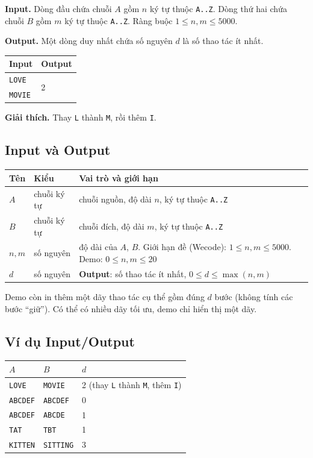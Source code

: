 \documentclass[12pt,a4paper]{article}
\newcommand{\code}[1]{\texttt{#1}}
\begin{document}
\textbf{Input.} Dòng đầu chứa chuỗi $A$ gồm $n$ ký tự thuộc \code{A..Z}. Dòng thứ hai chứa chuỗi $B$ gồm $m$ ký tự thuộc \code{A..Z}. Ràng buộc $1\le n,m\le 5000$.

\textbf{Output.} Một dòng duy nhất chứa số nguyên $d$ là số thao tác ít nhất.

\begin{center}
\begin{tabular}{@{}ll@{}}
\toprule
Input & Output\\
\midrule
\code{LOVE} & \multirow{2}{*}{2}\\
\code{MOVIE} &\\
\bottomrule
\end{tabular}
\end{center}
\textbf{Giải thích.} Thay \code{L} thành \code{M}, rồi thêm \code{I}.

\subsection{Input và Output}
\begin{center}
\begin{tabular}{@{}llp{8.2cm}@{}}
\toprule
\textbf{Tên} & \textbf{Kiểu} & \textbf{Vai trò và giới hạn}\\
\midrule
$A$ & chuỗi ký tự & chuỗi nguồn, độ dài $n$, ký tự thuộc \code{A..Z}\\
$B$ & chuỗi ký tự & chuỗi đích, độ dài $m$, ký tự thuộc \code{A..Z}\\
$n, m$ & số nguyên & độ dài của $A$, $B$. Giới hạn đề (Wecode): $1\le n,m\le 5000$. Demo: $0\le n,m\le 20$\\
\midrule
$d$ & số nguyên & \textbf{Output}: số thao tác ít nhất, $0\le d\le\max(n,m)$\\
\bottomrule
\end{tabular}
\end{center}
Demo còn in thêm một dãy thao tác cụ thể gồm đúng $d$ bước (không tính các bước ``giữ''). Có thể có nhiều dãy tối ưu, demo chỉ hiển thị một dãy.

\subsection{Ví dụ Input/Output}
\begin{center}
\begin{tabular}{@{}lll@{}}
\toprule
$A$ & $B$ & $d$\\
\midrule
\code{LOVE} & \code{MOVIE} & 2 (thay \code{L} thành \code{M}, thêm \code{I})\\
\code{ABCDEF} & \code{ABCDEF} & 0\\
\code{ABCDEF} & \code{ABCDE} & 1\\
\code{TAT} & \code{TBT} & 1\\
\code{KITTEN} & \code{SITTING} & 3\\
\bottomrule
\end{tabular}
\end{center}
\end{document}
